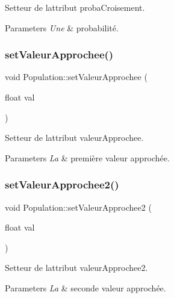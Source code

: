Setteur de l\textquotesingle{}attribut proba\+Croisement. 


\begin{DoxyParams}{Parameters}
{\em Une} & probabilité. \\
\hline
\end{DoxyParams}
\mbox{\label{class_population_ad3e0a26ca7b57924bcbb7a57d86056e4}} 
\subsubsection{\texorpdfstring{set\+Valeur\+Approchee()}{setValeurApprochee()}}
{\footnotesize\ttfamily void Population\+::set\+Valeur\+Approchee (\begin{DoxyParamCaption}\item[{float}]{val }\end{DoxyParamCaption})}



Setteur de l\textquotesingle{}attribut valeur\+Approchee. 


\begin{DoxyParams}{Parameters}
{\em La} & première valeur approchée. \\
\hline
\end{DoxyParams}
\mbox{\label{class_population_aa5645305dfca65e640ed76da9f851137}} 
\subsubsection{\texorpdfstring{set\+Valeur\+Approchee2()}{setValeurApprochee2()}}
{\footnotesize\ttfamily void Population\+::set\+Valeur\+Approchee2 (\begin{DoxyParamCaption}\item[{float}]{val }\end{DoxyParamCaption})}



Setteur de l\textquotesingle{}attribut valeur\+Approchee2. 


\begin{DoxyParams}{Parameters}
{\em La} & seconde valeur approchée. \\
\hline
\end{DoxyParams}
\mbox{\label{class_population_a3ec157b1b22558f3b6aa49279d6fcd5a}} 
